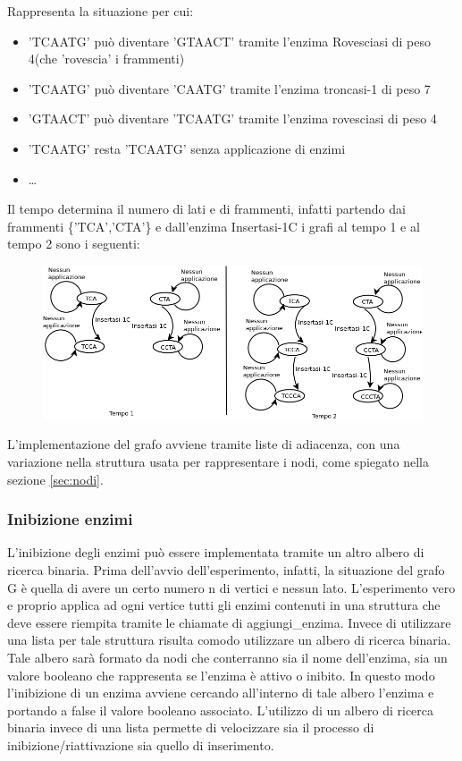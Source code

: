 \documentclass[a4paper,10pt]{article}
\begin{document}
Rappresenta la situazione per cui:
\begin{itemize}\item 'TCAATG' può diventare 'GTAACT' tramite l'enzima Rovesciasi di peso 4(che 'rovescia' i frammenti) \item 'TCAATG' può diventare 'CAATG' tramite l'enzima troncasi-1 di peso 7
\item 'GTAACT' può diventare 'TCAATG' tramite l'enzima rovesciasi di peso 4
\item 'TCAATG' resta 'TCAATG' senza applicazione di enzimi
\item \dots
\end{itemize}
Il tempo determina il numero di lati e di frammenti, infatti partendo dai frammenti \{'TCA','CTA'\} e dall'enzima Insertasi-1C i grafi al tempo 1 e al tempo 2 sono i seguenti:
\begin{figure}[htop]
\centering\includegraphics[scale=0.5]{graph2.png}\end{figure}


L'implementazione del grafo avviene tramite liste di adiacenza, con una variazione nella struttura usata per rappresentare i nodi, come spiegato nella sezione \ref{sec:nodi}.

\subsubsection{Inibizione enzimi}
L'inibizione degli enzimi può essere implementata tramite un altro albero di ricerca binaria. Prima dell'avvio dell'esperimento, infatti, la situazione del grafo G è quella di avere un certo numero n di vertici e nessun lato. L'esperimento vero e proprio applica ad ogni vertice tutti gli enzimi contenuti in una struttura che deve essere riempita tramite le chiamate di aggiungi\_enzima. Invece di utilizzare una lista per tale struttura risulta comodo utilizzare un albero di ricerca binaria. Tale albero sarà formato da nodi che conterranno sia il nome dell'enzima, sia un valore booleano che rappresenta se l'enzima è attivo o inibito. In questo modo l'inibizione di un enzima avviene cercando all'interno di tale albero l'enzima e portando a false il valore booleano associato. L'utilizzo di un albero di ricerca binaria invece di una lista permette di velocizzare sia il processo di inibizione/riattivazione sia quello di inserimento.
\end{document}
